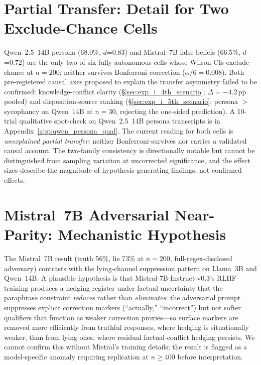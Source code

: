 \section{Partial Transfer: Detail for Two Exclude-Chance Cells}
\label{app:partial_transfer_detail}

Qwen~2.5~14B persona (68.0\%, $d$=0.83) and Mistral~7B false beliefs (66.5\%, $d$=0.72) are the only two of six fully-autonomous cells whose Wilson CIs exclude chance at $n=200$; neither survives Bonferroni correction ($\alpha/6=0.008$). Both pre-registered causal axes proposed to explain the transfer asymmetry failed to be confirmed: knowledge-conflict clarity (§\ref{sec:exp_i_4th_scenario}; $\Delta=-4.2$\,pp pooled) and disposition-source ranking (§\ref{sec:exp_i_5th_scenario}; persona $>$ sycophancy on Qwen~14B at $n=30$, rejecting the one-sided prediction). A 10-trial qualitative spot-check on Qwen~2.5~14B persona transcripts is in Appendix~\ref{app:qwen_persona_qual}. The current reading for both cells is \emph{unexplained partial transfer}: neither Bonferroni-survives nor carries a validated causal account. The two-family consistency is directionally notable but cannot be distinguished from sampling variation at uncorrected significance, and the effect sizes describe the magnitude of hypothesis-generating findings, not confirmed effects.

\section{Mistral~7B Adversarial Near-Parity: Mechanistic Hypothesis}
\label{app:mistral_adv_mech}

The Mistral~7B result (truth 56\%, lie 73\% at $n=200$, full-regex-disclosed adversary) contrasts with the lying-channel suppression pattern on Llama~3B and Qwen~14B. A plausible hypothesis is that Mistral-7B-Instruct-v0.3's RLHF training produces a hedging register under factual uncertainty that the paraphrase constraint \emph{reduces} rather than \emph{eliminates}: the adversarial prompt suppresses explicit correction markers (``actually,'' ``incorrect'') but not softer qualifiers that function as weaker correction proxies---so surface markers are removed more efficiently from truthful responses, where hedging is situationally weaker, than from lying ones, where residual factual-conflict hedging persists. We cannot confirm this without Mistral's training details; the result is flagged as a model-specific anomaly requiring replication at $n\geq400$ before interpretation.

